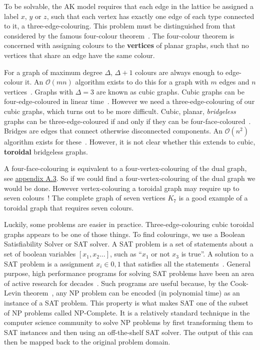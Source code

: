 To be solvable, the AK model requires that each edge in the lattice be assigned a label \(x\), \(y\) or \(z\), such that each vertex has exactly one edge of each type connected to it, a three-edge-colouring. This problem must be distinguished from that considered by the famous four-colour theorem~\autocite{appelEveryPlanarMap1989}. The four-colour theorem is concerned with assigning colours to the \textbf{vertices} of planar graphs, such that no vertices that share an edge have the same colour.

For a graph of maximum degree \(\Delta\), \(\Delta + 1\) colours are always enough to edge-colour it. An \(\mathcal{O}(mn)\) algorithm exists to do this for a graph with \(m\) edges and \(n\) vertices~\autocite{gEstimateChromaticClass1964}. Graphs with \(\Delta = 3\) are known as cubic graphs. Cubic graphs can be four-edge-coloured in linear time~\autocite{skulrattanakulchai4edgecoloringGraphsMaximum2002}. However we need a three-edge-colouring of our cubic graphs, which turns out to be more difficult. Cubic, planar, \emph{bridgeless} graphs can be three-edge-coloured if and only if they can be four-face-coloured~\autocite{tait1880remarks}. Bridges are edges that connect otherwise disconnected components. An \(\mathcal{O}(n^2)\) algorithm exists for these~\autocite{robertson1996efficiently}. However, it is not clear whether this extends to cubic, \textbf{toroidal} bridgeless graphs.

A four-face-colouring is equivalent to a four-vertex-colouring of the dual graph, see \protect\hyperlink{app-lattice-generation}{appendix A.3}. So if we could find a four-vertex-colouring of the dual graph we would be done. However vertex-colouring a toroidal graph may require up to seven colours~\autocite{heawoodMapColouringTheorems}! The complete graph of seven vertices \(K_7\) is a good example of a toroidal graph that requires seven colours.

Luckily, some problems are easier in practice. Three-edge-colouring cubic toroidal graphs appears to be one of those things. To find colourings, we use a Boolean Satisfiability Solver or SAT solver. A SAT problem is a set of statements about a set of boolean variables \([x_1, x_2\ldots]\), such as ``\(x_1\) or not \(x_3\) is true''. A solution to a SAT problem is a assignment \(x_i \in {0,1}\) that satisfies all the statements~\autocite{Karp1972}. General purpose, high performance programs for solving SAT problems have been an area of active research for decades~\autocite{alounehComprehensiveStudyAnalysis2019}. Such programs are useful because, by the Cook-Levin theorem~\autocite{cookComplexityTheoremprovingProcedures1971,levin1973universal}, any NP problem can be encoded (in polynomial time) as an instance of a SAT problem. This property is what makes SAT one of the subset of NP problems called NP-Complete. It is a relatively standard technique in the computer science community to solve NP problems by first transforming them to SAT instances and then using an off-the-shelf SAT solver. The output of this can then be mapped back to the original problem domain.

